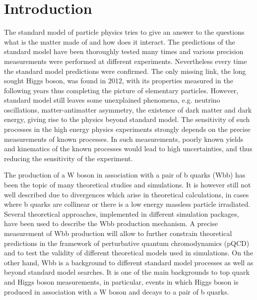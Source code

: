 
\chapter{Introduction} %

\label{Chapter1} %


The standard model of particle physics tries to give an answer to the questions what is the matter made of and how does it interact. The predictions of the standard model have been thoroughly tested many times and various precision measurements were performed at different experiments. Nevertheless every time the standard model predictions were confirmed. The only missing link, the long sought Higgs boson, was found in 2012, with its properties measured in the following years thus completing the picture of elementary particles. However, standard model still leaves some unexplained phenomena, e.g. neutrino oscillations, matter-antimatter asymmetry, the existence of dark matter and dark energy, giving rise to the physics beyond standard model. The sensitivity of such processes in the high energy physics experiments strongly depends on the precise measurements of known processes. In such measurements, poorly known yields and kinematics of the known processes would lead to high uncertainties, and thus reducing the sensitivity of the experiment. 
\par The production of a W boson in association with a pair of b quarks (Wbb) has
been the topic of many theoretical studies and simulations. It is however still not well described due to divergences which arise in theoretical calculations, in cases where b quarks are collinear or there is a low energy massless particle irradiated. Several theoretical
approaches, implemented in different simulation packages, have been used to describe the Wbb production mechanism. A precise measurement of Wbb production will allow to
further constrain theoretical predictions in the framework of perturbative quantum chromodynamics (pQCD) and to test the validity of different theoretical models used in simulations. On the other hand, Wbb is a background to different standard model processes as well as beyond standard model searches. It is one of the main backgrounds to top quark  and Higgs boson measurements, in particular, events in which Higgs boson is produced in association with a W boson and decays to a pair of b quarks.
